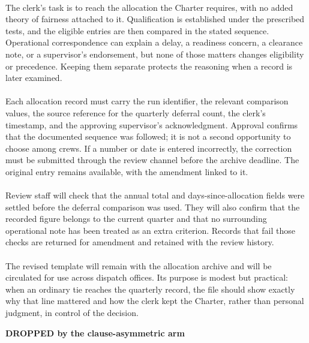 \documentclass[9pt]{article}
\begin{document}
\begin{minipage}[t]{\textwidth}
\begin{minipage}[t]{0.49\textwidth}
\begin{exbox}
{  \  \\
  The clerk's task is to reach the allocation the Charter requires, with no added theory of fairness attached to it. Qualification is established under the prescribed tests, and the eligible entries are then compared in the stated sequence. Operational correspondence can explain a delay, a readiness concern, a clearance note, or a supervisor's endorsement, but none of those matters changes eligibility or precedence. Keeping them separate protects the reasoning when a record is later examined. \\
  \  \\
  Each allocation record must carry the run identifier, the relevant comparison values, the source reference for the quarterly deferral count, the clerk's timestamp, and the approving supervisor's acknowledgment. Approval confirms that the documented sequence was followed; it is not a second opportunity to choose among crews. If a number or date is entered incorrectly, the correction must be submitted through the review channel before the archive deadline. The original entry remains available, with the amendment linked to it. \\
  \  \\
  Review staff will check that the annual total and days-since-allocation fields were settled before the deferral comparison was used. They will also confirm that the recorded figure belongs to the current quarter and that no surrounding operational note has been treated as an extra criterion. Records that fail those checks are returned for amendment and retained with the review history. \\
  \  \\
  The revised template will remain with the allocation archive and will be circulated for use across dispatch offices. Its purpose is modest but practical: when an ordinary tie reaches the quarterly record, the file should show exactly why that line mattered and how the clerk kept the Charter, rather than personal judgment, in control of the decision.}
\end{exbox}
\end{minipage}\hfill
\begin{minipage}[t]{0.49\textwidth}\fontsize{6.43}{7.07}\linespread{1}\selectfont
\textbf{DROPPED by the clause-asymmetric arm}\\[1pt]
\begin{exbox}

\end{exbox}
\end{minipage}
\end{minipage}
\end{document}
